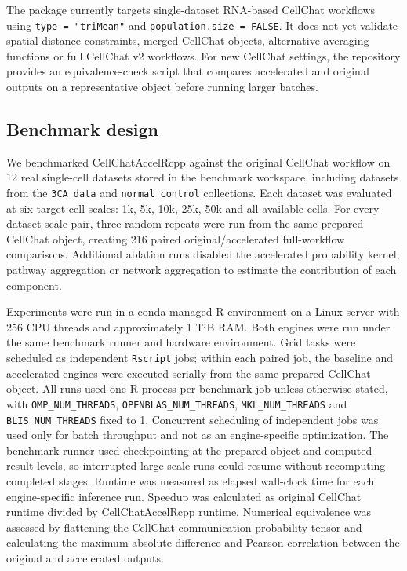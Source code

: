 \documentclass[unnumsec,webpdf,contemporary,large]{oup-authoring-template}
\begin{document}
The package currently targets single-dataset RNA-based CellChat workflows using \texttt{type = "triMean"} and \texttt{population.size = FALSE}.
It does not yet validate spatial distance constraints, merged CellChat objects, alternative averaging functions or full CellChat v2 workflows.
For new CellChat settings, the repository provides an equivalence-check script that compares accelerated and original outputs on a representative object before running larger batches.

\subsection{Benchmark design}

We benchmarked CellChatAccelRcpp against the original CellChat workflow on 12 real single-cell datasets stored in the benchmark workspace, including datasets from the \texttt{3CA\_data} and \texttt{normal\_control} collections.
Each dataset was evaluated at six target cell scales: 1k, 5k, 10k, 25k, 50k and all available cells.
For every dataset-scale pair, three random repeats were run from the same prepared CellChat object, creating 216 paired original/accelerated full-workflow comparisons.
Additional ablation runs disabled the accelerated probability kernel, pathway aggregation or network aggregation to estimate the contribution of each component.

Experiments were run in a conda-managed R environment on a Linux server with 256 CPU threads and approximately 1 TiB RAM.
Both engines were run under the same benchmark runner and hardware environment.
Grid tasks were scheduled as independent \texttt{Rscript} jobs; within each paired job, the baseline and accelerated engines were executed serially from the same prepared CellChat object.
All runs used one R process per benchmark job unless otherwise stated, with \texttt{OMP\_NUM\_THREADS}, \texttt{OPENBLAS\_NUM\_THREADS}, \texttt{MKL\_NUM\_THREADS} and \texttt{BLIS\_NUM\_THREADS} fixed to 1.
Concurrent scheduling of independent jobs was used only for batch throughput and not as an engine-specific optimization.
The benchmark runner used checkpointing at the prepared-object and computed-result levels, so interrupted large-scale runs could resume without recomputing completed stages.
Runtime was measured as elapsed wall-clock time for each engine-specific inference run.
Speedup was calculated as original CellChat runtime divided by CellChatAccelRcpp runtime.
Numerical equivalence was assessed by flattening the CellChat communication probability tensor and calculating the maximum absolute difference and Pearson correlation between the original and accelerated outputs.
\end{document}
